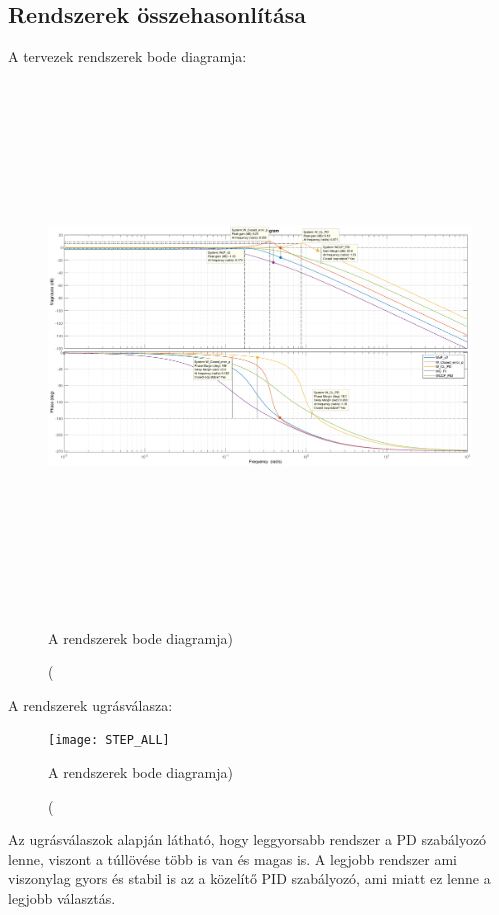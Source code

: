 \documentclass[12pt]{article}
\begin{document}
\subsection{Rendszerek összehasonlítása}
A tervezek rendszerek bode diagramja:
\begin{figure}[H]
\centering
\includegraphics[width=180mm,height=140mm]{BODE_ALL}
\caption(A rendszerek bode diagramja)
\end{figure}
A rendszerek ugrásválasza:
 \begin{figure}[H]
\centering
\texttt{[image: STEP\_ALL]}
\caption(A rendszerek bode diagramja)
\end{figure}
Az ugrásválaszok alapján látható, hogy leggyorsabb rendszer a PD szabályozó lenne, viszont a túllövése több is van és magas is. A legjobb rendszer ami viszonylag gyors és stabil is az a közelítő PID szabályozó, ami miatt ez lenne a legjobb választás.
\end{document}
